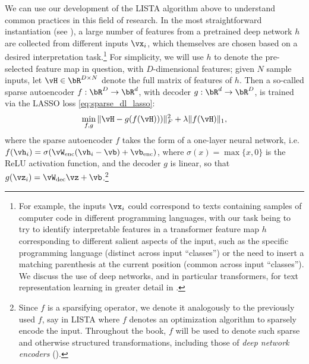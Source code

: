 \documentclass[../../book-main.tex]{subfiles}
\begin{document}
    We can use our development of the LISTA algorithm above to understand common
    practices in this field of research.
    In the most straightforward instantiation (see \citep{huben2024sparse,
    gao2025scaling}), a large number of features from a pretrained
    deep network $h$
    are collected from different inputs $\vx_i$, which themselves are
    chosen based
    on a desired interpretation task.\footnote{For example, the
        inputs $\vx_i$ could
        correspond to texts containing samples of computer code in
        different programming
        languages, with our task being to try to identify
        interpretable features in
        a transformer feature map $h$ corresponding to different
        salient aspects of the
        input, such as the specific programming language (distinct across input
        ``classes'') or the need to insert a matching parenthesis at the current
        position (common across input ``classes''). We discuss the
        use of deep networks,
        and in particular transformers, for text representation
    learning in greater detail in .} For
    simplicity, we will use $h$ to denote the pre-selected feature
    map in question,
    with $D$-dimensional features; given $N$ sample inputs, let $\vH \in \bR^{D
    \times N}$ denote the full matrix of features of $h$.
    Then a so-called sparse autoencoder $f : \bR^D \to \bR^d$, with
    decoder $g : \bR^d \to
    \bR^D$, is trained via the LASSO loss \eqref{eq:sparse_dl_lasso}:
    \begin{equation}\label{eq:sae-loss}
    \min_{f, g} \| \vH - g(f(\vH))) \|_F^2 + \lambda \|f(\vH)\|_1 ,
\end{equation}
where the sparse autoencoder $f$ takes the form of a one-layer neural
network, i.e.\ $f(\vh_i) = \sigma(\vW_{\mathrm{enc}}(\vh_i - \vb)
+ \vb_{\mathrm{enc}})$, where $\sigma(x) = \max \{x, 0\}$ is the ReLU activation
function, and the decoder $g$ is linear, so that $g(\vz_i)
= \vW_{\mathrm{dec}}\vz + \vb$.\footnote{Since \(f\) is a sparsifying
    operator, we denote it analogously to the previously used \(f\), say
    in LISTA where \(f\) denotes an optimization algorithm to sparsely
    encode the input. Throughout the book, \(f\) will be used to denote
    such sparse and otherwise structured transformations, including those
    of \textit{deep network encoders}
().}
\end{document}

